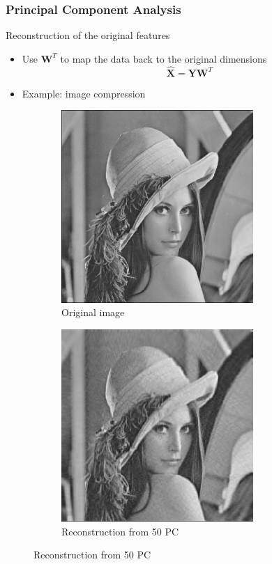 \documentclass[12pt,a4paper,xcolor=dvipsnames,xcolor=table]{beamer}
\begin{document}
\begin{frame}[t]
    \frametitle{Principal Component Analysis}
    Reconstruction of the original features
    \begin{itemize}
        \item Use $\mathbf{W}^T$ to map the data back to the original dimensions 
        \[ 
            \hat{\mathbf{X}} = \mathbf{Y} \mathbf{W}^T
        \]
        \item Example: image compression
    \end{itemize}
    \begin{figure}
        \centering
        \begin{subfigure}{0.495\textwidth}
            \centering 
            \includegraphics[width=0.8\textwidth]{fig/pca_reconstruction_1}
            \caption{Original image}
        \end{subfigure}
        \begin{subfigure}{0.495\textwidth}
            \centering
            \includegraphics[width=0.8\textwidth]{fig/pca_reconstruction_2}
            \caption{Reconstruction from 50 PC}
        \end{subfigure}
    \end{figure}
\end{frame}
\end{document}
